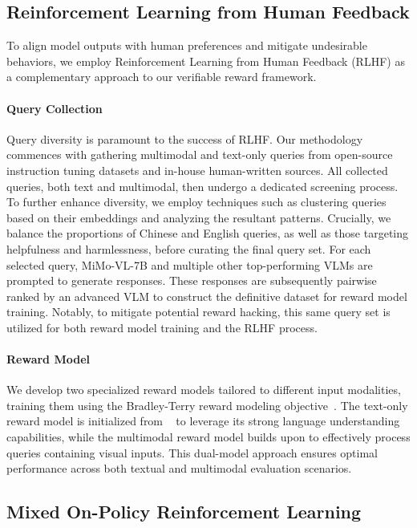 \subsection{Reinforcement Learning from Human Feedback}
To align model outputs with human preferences and mitigate undesirable behaviors, we employ Reinforcement Learning from Human Feedback (RLHF) as a complementary approach to our verifiable reward framework.


\paragraph{Query Collection}

Query diversity is paramount to the success of RLHF. Our methodology commences with gathering multimodal and text-only queries from open-source instruction tuning datasets and in-house human-written sources. All collected queries, both text and multimodal, then undergo a dedicated screening process. To further enhance diversity, we employ techniques such as clustering queries based on their embeddings and analyzing the resultant patterns. Crucially, we balance the proportions of Chinese and English queries, as well as those targeting helpfulness and harmlessness, before curating the final query set. For each selected query, MiMo-VL-7B and multiple other top-performing VLMs are prompted to generate responses. These responses are subsequently pairwise ranked by an advanced VLM to construct the definitive dataset for reward model training. Notably, to mitigate potential reward hacking, this same query set is utilized for both reward model training and the RLHF process.



\paragraph{Reward Model}
We develop two specialized reward models tailored to different input modalities, training them using the Bradley-Terry reward modeling objective~\citep{ouyang2022instructgpt}. 
The text-only reward model is initialized from \mimo{}~\citep{xia2025mimo} to leverage its strong language understanding capabilities, while the multimodal reward model builds upon \mimovl{} to effectively process queries containing visual inputs. This dual-model approach ensures optimal performance across both textual and multimodal evaluation scenarios.


\subsection{Mixed On-Policy Reinforcement Learning}

